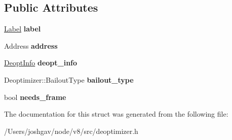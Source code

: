 \subsection*{Public Attributes}
\begin{DoxyCompactItemize}
\item 
\hyperlink{classv8_1_1internal_1_1_label}{Label} {\bfseries label}\hypertarget{structv8_1_1internal_1_1_deoptimizer_1_1_jump_table_entry_a773518a70aa1fc7bb2522f4f32aa7061}{}\label{structv8_1_1internal_1_1_deoptimizer_1_1_jump_table_entry_a773518a70aa1fc7bb2522f4f32aa7061}

\item 
Address {\bfseries address}\hypertarget{structv8_1_1internal_1_1_deoptimizer_1_1_jump_table_entry_a05e545ad11c8aacddc3e2043f5436312}{}\label{structv8_1_1internal_1_1_deoptimizer_1_1_jump_table_entry_a05e545ad11c8aacddc3e2043f5436312}

\item 
\hyperlink{structv8_1_1internal_1_1_deoptimizer_1_1_deopt_info}{Deopt\+Info} {\bfseries deopt\+\_\+info}\hypertarget{structv8_1_1internal_1_1_deoptimizer_1_1_jump_table_entry_ad341147e4234d33130c4187b4edde76d}{}\label{structv8_1_1internal_1_1_deoptimizer_1_1_jump_table_entry_ad341147e4234d33130c4187b4edde76d}

\item 
Deoptimizer\+::\+Bailout\+Type {\bfseries bailout\+\_\+type}\hypertarget{structv8_1_1internal_1_1_deoptimizer_1_1_jump_table_entry_ad60122e0236f06e3159fee027ed9da37}{}\label{structv8_1_1internal_1_1_deoptimizer_1_1_jump_table_entry_ad60122e0236f06e3159fee027ed9da37}

\item 
bool {\bfseries needs\+\_\+frame}\hypertarget{structv8_1_1internal_1_1_deoptimizer_1_1_jump_table_entry_a4861a397798dc81c0db98e2f621480bf}{}\label{structv8_1_1internal_1_1_deoptimizer_1_1_jump_table_entry_a4861a397798dc81c0db98e2f621480bf}

\end{DoxyCompactItemize}


The documentation for this struct was generated from the following file\+:\begin{DoxyCompactItemize}
\item 
/\+Users/joshgav/node/v8/src/deoptimizer.\+h\end{DoxyCompactItemize}
